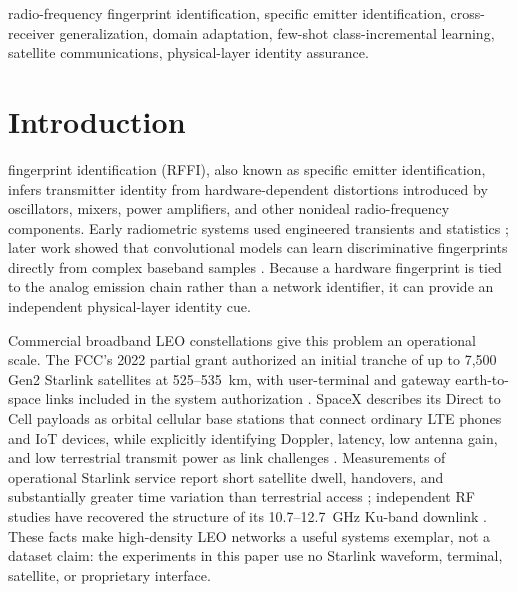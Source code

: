 \documentclass[journal]{IEEEtran}
\begin{document}
\begin{IEEEkeywords}
radio-frequency fingerprint identification, specific emitter identification, cross-receiver generalization, domain adaptation, few-shot class-incremental learning, satellite communications, physical-layer identity assurance.
\end{IEEEkeywords}

\section{Introduction}
 fingerprint identification (RFFI), also known as specific emitter identification, infers transmitter identity from hardware-dependent distortions introduced by oscillators, mixers, power amplifiers, and other nonideal radio-frequency components. Early radiometric systems used engineered transients and statistics \cite{brik2008paradis}; later work showed that convolutional models can learn discriminative fingerprints directly from complex baseband samples \cite{merchant2018deep,riyaz2018radioid,sankhe2019oracle}. Because a hardware fingerprint is tied to the analog emission chain rather than a network identifier, it can provide an independent physical-layer identity cue.

Commercial broadband LEO constellations give this problem an operational scale. The FCC's 2022 partial grant authorized an initial tranche of up to 7,500 Gen2 Starlink satellites at 525--535~km, with user-terminal and gateway earth-to-space links included in the system authorization \cite{fcc2022starlinkgen2}. SpaceX describes its Direct to Cell payloads as orbital cellular base stations that connect ordinary LTE phones and IoT devices, while explicitly identifying Doppler, latency, low antenna gain, and low terrestrial transmit power as link challenges \cite{spacex2025directtocell}. Measurements of operational Starlink service report short satellite dwell, handovers, and substantially greater time variation than terrestrial access \cite{ma2023starlink}; independent RF studies have recovered the structure of its 10.7--12.7~GHz Ku-band downlink \cite{humphreys2023starlink}. These facts make high-density LEO networks a useful systems exemplar, not a dataset claim: the experiments in this paper use no Starlink waveform, terminal, satellite, or proprietary interface.
\end{document}

